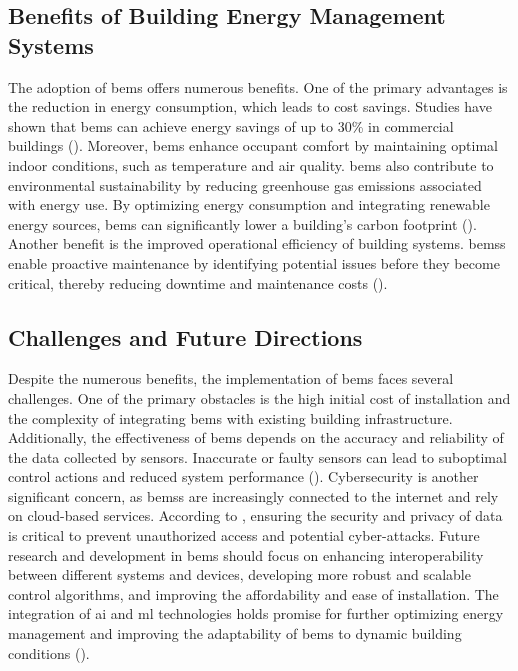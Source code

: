 \subsection*{Benefits of Building Energy Management Systems}
The adoption of \gls{bems} offers numerous benefits.
One of the primary advantages is the reduction in energy consumption, which leads to cost savings.
Studies have shown that \gls{bems} can achieve energy savings of up to 30\% in commercial buildings (\cite{Wags2024}).
Moreover, \gls{bems} enhance occupant comfort by maintaining optimal indoor conditions, such as temperature and air quality.
\gls{bems} also contribute to environmental sustainability by reducing greenhouse gas emissions associated with energy use.
By optimizing energy consumption and integrating renewable energy sources, \gls{bems} can significantly lower a building's carbon footprint (\cite{Lee2016}).
Another benefit is the improved operational efficiency of building systems.
\glspl{bems} enable proactive maintenance by identifying potential issues before they become critical, thereby reducing downtime and maintenance costs (\cite{Klein2012}).

\subsection*{Challenges and Future Directions}
Despite the numerous benefits, the implementation of \gls{bems} faces several challenges.
One of the primary obstacles is the high initial cost of installation and the complexity of integrating \gls{bems} with existing building infrastructure.
Additionally, the effectiveness of \gls{bems} depends on the accuracy and reliability of the data collected by sensors.
Inaccurate or faulty sensors can lead to suboptimal control actions and reduced system performance (\cite{Kokogiannakis2008}).
Cybersecurity is another significant concern, as \glspl{bems} are increasingly connected to the internet and rely on cloud-based services.
According to \cite{Minoli2017}, ensuring the security and privacy of data is critical to prevent unauthorized access and potential cyber-attacks.
Future research and development in \gls{bems} should focus on enhancing interoperability between different systems and devices, developing more robust and scalable control algorithms, and improving the affordability and ease of installation.
The integration of \gls{ai} and \gls{ml} technologies holds promise for further optimizing energy management and improving the adaptability of \gls{bems} to dynamic building conditions (\cite{Amasyali2018}).

